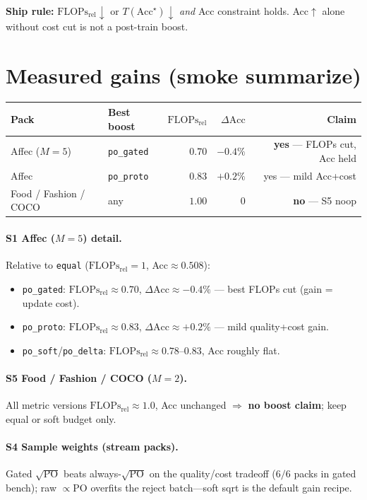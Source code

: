 \documentclass[11pt]{article}
\newcommand{\PO}{\mathrm{PO}}
\newcommand{\Flops}{\mathrm{FLOPs}_{\mathrm{rel}}}
\newcommand{\Acc}{\mathrm{Acc}}
\begin{document}
\noindent\textbf{Ship rule:}
$\Flops\downarrow$ or $T(\Acc^\star)\downarrow$
\emph{and} Acc constraint holds.
Acc$\uparrow$ alone without cost cut is not a post-train boost.

\section{Measured gains (smoke summarize)}
\label{sec:emp}

\begin{center}
\small
\begin{tabular}{@{}llrrr@{}}
\toprule
Pack & Best boost & $\Flops$ & $\Delta\Acc$ & Claim \\
\midrule
Affec ($M{=}5$)
  & \texttt{po\_gated}
  & $0.70$
  & $-0.4\%$
  & \textbf{yes} --- FLOPs cut, Acc held \\
Affec
  & \texttt{po\_proto}
  & $0.83$
  & $+0.2\%$
  & yes --- mild Acc+cost \\
Food / Fashion / COCO
  & any
  & $1.00$
  & $0$
  & \textbf{no} --- S5 noop \\
\bottomrule
\end{tabular}
\end{center}

\paragraph{S1 Affec ($M{=}5$) detail.}
Relative to \texttt{equal} ($\Flops{=}1$, Acc$\approx0.508$):
\begin{itemize}[leftmargin=1.2em,itemsep=1pt]
  \item \texttt{po\_gated}: $\Flops\approx0.70$, $\Delta\Acc\approx-0.4\%$
        --- best FLOPs cut (gain = update cost).
  \item \texttt{po\_proto}: $\Flops\approx0.83$, $\Delta\Acc\approx+0.2\%$
        --- mild quality+cost gain.
  \item \texttt{po\_soft}/\texttt{po\_delta}: $\Flops\approx0.78$--$0.83$,
        Acc roughly flat.
\end{itemize}

\paragraph{S5 Food / Fashion / COCO ($M{=}2$).}
All metric versions $\Flops\approx1.0$, Acc unchanged
$\Rightarrow$ \textbf{no boost claim}; keep equal or soft budget only.

\paragraph{S4 Sample weights (stream packs).}
Gated $\sqrt{\PO}$ beats always-$\sqrt{\PO}$ on the
quality/cost tradeoff ($6/6$ packs in gated bench);
raw $\propto\PO$ overfits the reject batch---soft sqrt is the
default gain recipe.
\end{document}
